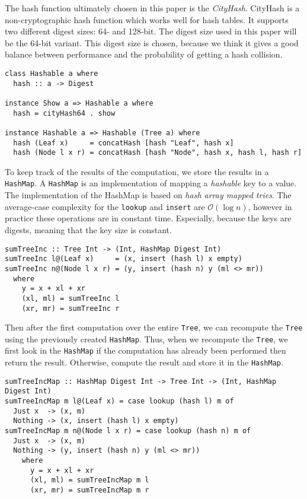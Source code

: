 The hash function ultimately chosen in this paper is the \textit{CityHash}\cite{hackage2022cityhash}. CityHash is a non-cryptographic hash function which works well for hash tables\cite{google2022cityhash}. It supports two different digest sizes: 64- and 128-bit. The digest size used in this paper will be the 64-bit variant. This digest size is chosen, because we think it gives a good balance between performance and the probability of getting a hash collision.

\begin{verbatim}
class Hashable a where
  hash :: a -> Digest

instance Show a => Hashable a where
  hash = cityHash64 . show

instance Hashable a => Hashable (Tree a) where
  hash (Leaf x)     = concatHash [hash "Leaf", hash x]
  hash (Node l x r) = concatHash [hash "Node", hash x, hash l, hash r]
\end{verbatim}

To keep track of the results of the computation, we store the results in a \texttt{HashMap}\cite{hackage2022hashmap}. A \texttt{HashMap} is an implementation of mapping a \textit{hashable} key to a value. The implementation of the HashMap is based on \textit{hash array mapped tries}\cite*{bagwell2001ideal}. The average-case complexity for the \texttt{lookup} and \texttt{insert} are $\mathcal{O}(\log{n})$, however in practice these operations are in constant time. Especially, because the keys are digests, meaning that the key size is constant.

\begin{verbatim}
sumTreeInc :: Tree Int -> (Int, HashMap Digest Int)
sumTreeInc l@(Leaf x)     = (x, insert (hash l) x empty)
sumTreeInc n@(Node l x r) = (y, insert (hash n) y (ml <> mr))
  where
    y = x + xl + xr
    (xl, ml) = sumTreeInc l
    (xr, mr) = sumTreeInc r
\end{verbatim}

Then after the first computation over the entire \texttt{Tree}, we can recompute the \texttt{Tree} using the previously created \texttt{HashMap}. Thus, when we recompute the \texttt{Tree}, we first look in the \texttt{HashMap} if the computation has already been performed then return the result. Otherwise, compute the result and store it in the \texttt{HashMap}.

\begin{verbatim}
sumTreeIncMap :: HashMap Digest Int -> Tree Int -> (Int, HashMap Digest Int)
sumTreeIncMap m l@(Leaf x) = case lookup (hash l) m of
  Just x  -> (x, m) 
  Nothing -> (x, insert (hash l) x empty)
sumTreeIncMap m n@(Node l x r) = case lookup (hash n) m of
  Just x  -> (x, m)
  Nothing -> (y, insert (hash n) y (ml <> mr))
    where
      y = x + xl + xr
      (xl, ml) = sumTreeIncMap m l
      (xr, mr) = sumTreeIncMap m r
\end{verbatim}

